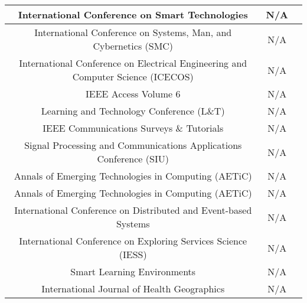 \begin{landscape}
\begin{center}
\begin{tabular}{ |c|c|c| }
 	\hline
 	International Conference on Smart Technologies  & N/A & \cite{2017_Karafiloski} \\ 
 	\hline
 	International Conference on Systems, Man, and Cybernetics (SMC) & N/A & \cite{2017_Mingxiao} \\ 
 	\hline
 	International Conference on Electrical Engineering and Computer Science (ICECOS) & N/A & \cite{2017_Tama} \\ 
 	\hline
 	IEEE Access Volume 6 & N/A & \cite{2017_Yeow} \cite{2018_Fernandez} \cite{2018_Meng}\\ 
 	\hline
 	Learning and Technology Conference (L\&T) & N/A & \cite{2018_Alketbi} \\ 
 	\hline
 	IEEE Communications Surveys \& Tutorials & N/A & \cite{2018_Conti} \\ 
 	\hline
 	Signal Processing and Communications Applications Conference (SIU) & N/A & \cite{2018_Ekin} \\ 
 	\hline
 	Annals of Emerging Technologies in Computing (AETiC) & N/A & \cite{2018_Miraz} \\ 
 	\hline
 	Annals of Emerging Technologies in Computing (AETiC) & N/A & \cite{2018_Miraz} \\ 
 	\hline
 	International Conference on Distributed and Event-based Systems & N/A & \cite{2018_Zhang} \\ 
 	\hline
 	International Conference on Exploring Services Science (IESS) & N/A & \cite{2017_Seebacher} \\ 
 	\hline
 	Smart Learning Environments & N/A & \cite{2018_Chen} \\ 
 	\hline
 	International Journal of Health Geographics & N/A & \cite{2018_Boulos} \\ 
 	\hline
\end{tabular}
\end{center}
\end{landscape}
